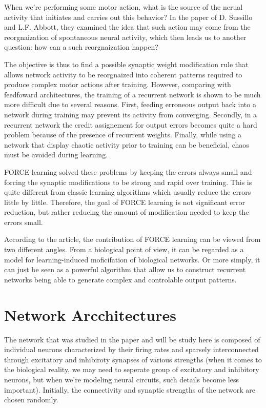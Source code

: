When we're performing some motor action, what is the source of the nerual
activity that initiates and carries out this behavior? In the paper of
D. Sussillo and L.F. Abbott, they examined the idea that such action
may come from the reorgnaization of spontaneous neural activity, which then
leads us to another question: how can a such reorgnaization happen?

The objective is thus to find a possible synaptic weight modification rule
that allows network activity to be reorgnaized into coherent patterns 
required to produce complex motor actions after training. However, comparing
with feedfoward architectures, the training of a recurrent network is
shown to be much more difficult due to several reasons.
First, feeding erroneous output back into a network during training may
prevent its activity from converging. Secondly, in a recurrent network
the credit assignement for output errors becomes quite a hard problem because
of the presence of recurrent weights. Finally, while using a network that
display chaotic activity prior to training can be beneficial, chaos
must be avoided during learning.

FORCE learning solved these problems by keeping the errors always small
and forcing the synaptic modifications to be strong and rapid over training.
This is quite different from classic learning algorithms which usually
reduce the errors little by little. Therefore, the goal of FORCE learning
is not significant error reduction, but rather reducing the amount of
modification needed to keep the errors small.

According to the article, the contribution of FORCE learning can be
viewed from two different angles. From a biological point of view, it can
be regarded as a model for learning-induced moficifation of biological
networks. Or more simply, it can just be seen as a powerful algorithm that
allow us to construct recurrent networks being able to generate complex
and controlable output patterns.


\section{Network Arcchitectures}

The network that was studied in the paper and will be study here is composed
of individual neurons characterized by their firing rates and
sparsely interconnected through excitatory and inhibiroty synapses of 
various strengths (when it comes to the biological reality, we may need to
seperate group of excitatory and inhibitory neurons, but when we're modeling
neural circuits, such details become less important). Initially, the
connectivity and synaptic strengths of the network are chosen randomly.

